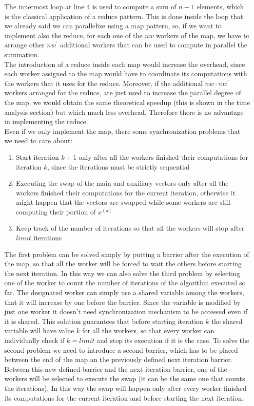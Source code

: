\documentclass[12pt]{article}
\begin{document}
	The innermost loop at line 4 is used to compute a sum of $n-1$ elements, which is the classical application of a reduce pattern. This is done inside the loop that we already said we can parallelize using a map pattern, so, if we want to implement also the reduce, for each one of the $nw$ workers of the map, we have to arrange other $nw^\prime$ additional workers that can be used to compute in parallel the summation.\\
	The introduction of a reduce inside each map would increase the overhead, since each worker assigned to the map would have to coordinate its computations with the workers that it uses for the reduce. Moreover, if the additional $nw\cdot nw^\prime$ workers arranged for the reduce, are just used to increase the parallel degree of the map, we would obtain the same theoretical speedup (this is shown in the time analysis section) but which much less overhead. Therefore there is no advantage in implementing the reduce.\\
	Even if we only implement the map, there some synchronization problems that we need to care about:
	\begin{enumerate}
		\item Start iteration $k+1$ only after all the workers finished their computations for iteration $k$, since the iterations must be strictly sequential 
		\item Executing the swap of the main and auxiliary vectors only after all the workers finished their computations for the current iteration, otherwise it might happen that the vectors are swapped while some workers are still computing their portion of $x^{(k)}$
		\item Keep track of the number of iterations so that all the workers will stop after $limit$ iterations
	\end{enumerate}
	The first problem can be solved simply by putting a barrier after the execution of the map, so that all the worker will be forced to wait the others before starting the next iteration. In this way we can also solve the third problem by selecting one of the worker to count the number of iterations of the algorithm executed so far. The designated worker can simply use a shared variable among the workers, that it will increase by one before the barrier. Since the variable is modified by just one worker it doesn't need synchronization mechanism to be accessed even if it is shared. This solution guarantees that before starting iteration $k$ the shared variable will have value $k$ for all the workers, so that every worker can individually check if $k = limit$ and stop its execution if it is the case. To solve the second problem we need to introduce a second barrier, which has to be placed between the end of the map an the previously defined next iteration barrier. Between this new defined barrier and the next iteration barrier, one of the workers will be selected to execute the swap (it can be the same one that counts the iterations). In this way the swap will happen only after every worker finished its computations for the current iteration and before starting the next iteration.\\
\end{document}
